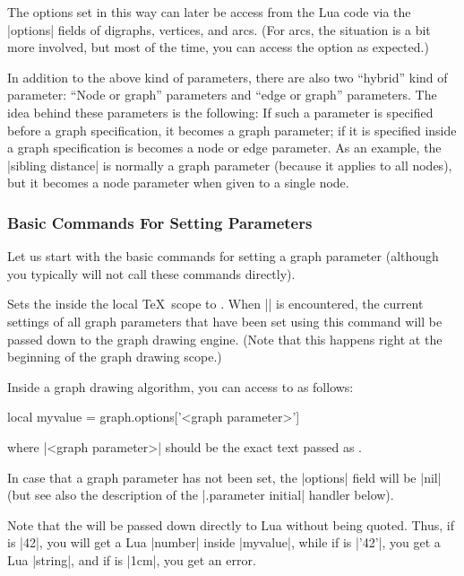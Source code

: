 The options set in this way can later be access from the Lua code via
the |options| fields of digraphs, vertices, and arcs. (For arcs, the
situation is a bit more involved, but most of the time, you can access
the option as expected.)

In addition to the above kind of parameters, there are also two
``hybrid'' kind of parameter: ``Node or graph'' parameters and ``edge
or graph'' parameters. The idea behind these parameters is the
following: If such a parameter is specified before a graph
specification, it becomes a graph parameter; if it is specified inside
a graph specification is becomes a node or edge parameter. As an
example, the |sibling distance| is normally a graph parameter (because
it applies to all nodes), but it becomes a node parameter when given
to a single node.


\subsubsection{Basic Commands For Setting Parameters}

Let us start with the basic commands for setting a graph parameter
(although you typically will not call these commands directly).

\begin{command}{\pgfgdgraphparameter{}} 
  Sets the  inside the local \TeX\ scope to
  . When |\pgfgdbeginscope| is encountered,
  the current settings of all graph parameters that have been set
  using this command will be passed down to the graph drawing
  engine. (Note that this happens right at the beginning of the graph
  drawing scope.)

  Inside a graph drawing algorithm, you can access to  as
  follows:
\begin{codeexample}
  local myvalue = graph.options['<graph parameter>']
\end{codeexample}
  where |<graph parameter>| should be the exact text passed as
  .

  In case that a graph parameter has not been set, the |options| field
  will be |nil| (but see also the description of the
  |.parameter initial| handler below).

  Note that the  will be passed down directly to Lua
  without being quoted. Thus, if  is |42|, you will get a
  Lua |number| inside |myvalue|, while if  is |'42'|, you
  get a Lua |string|, and if  is |1cm|, you get an error.
\end{command}


